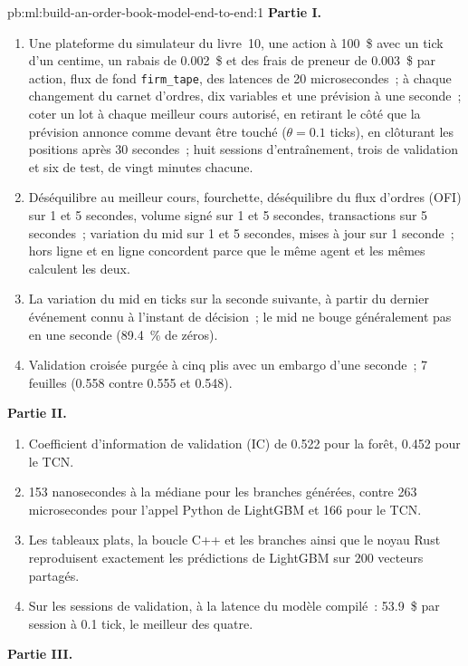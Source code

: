 \begin{solution}{pb:ml:build-an-order-book-model-end-to-end:1}
\textbf{Partie I.}
\begin{enumerate}
\item Une plateforme du simulateur du livre~10, une action à 100~\$ avec un tick d'un centime, un rabais de 0.002~\$ et des frais de preneur de 0.003~\$ par action,
flux de fond \texttt{firm\_tape}, des latences de 20 microsecondes~; à chaque changement du carnet d'ordres, dix variables et une prévision à une seconde~; coter un lot
à chaque meilleur cours autorisé, en retirant le côté que la prévision annonce comme devant être touché ($\theta=0.1$ ticks), en clôturant les positions après 30
secondes~; huit sessions d'entraînement, trois de validation et six de test, de vingt minutes chacune.
\item Déséquilibre au meilleur cours, fourchette, déséquilibre du flux d'ordres (OFI) sur 1 et 5 secondes, volume signé sur 1 et 5 secondes, transactions sur 5
secondes~; variation du mid sur 1 et 5 secondes, mises à jour sur 1 seconde~; hors ligne et en ligne concordent parce que le même agent et les mêmes
 calculent les deux.
\item La variation du mid en ticks sur la seconde suivante, à partir du dernier événement connu à l'instant de décision~; le mid ne bouge généralement pas en une
seconde (89.4~\% de zéros).
\item Validation croisée purgée à cinq plis avec un embargo d'une seconde~; 7 feuilles (0.558 contre 0.555 et 0.548).
\end{enumerate}
\textbf{Partie II.}
\begin{enumerate}[resume]
\item Coefficient d'information de validation (IC) de 0.522 pour la forêt, 0.452 pour le TCN.
\item 153 nanosecondes à la médiane pour les branches générées, contre 263 microsecondes pour l'appel Python de LightGBM et 166 pour
le TCN.
\item Les tableaux plats, la boucle C++ et les branches ainsi que le noyau Rust reproduisent exactement les prédictions de LightGBM sur 200 vecteurs partagés.
\item Sur les sessions de validation, à la latence du modèle compilé~: 53.9~\$ par session à 0.1 tick, le meilleur des quatre.
\end{enumerate}
\textbf{Partie III.}
\begin{enumerate}[resume]

\end{enumerate}
\end{solution}
